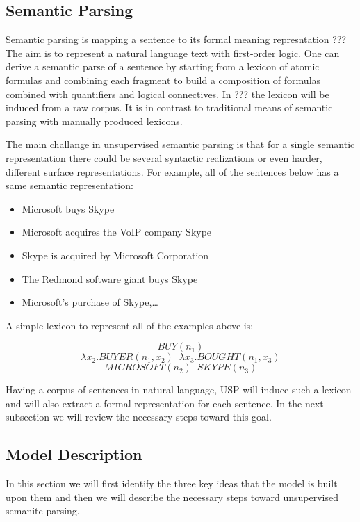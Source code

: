 \documentclass[12pt]{report}
\begin{document}
\subsection{Semantic Parsing}
\label{ch:definition}

Semantic parsing is mapping a sentence to its formal meaning represntation ???%
The aim is to represent a natural language text with first-order logic. One can derive a semantic parse of a sentence
by starting from a lexicon of atomic formulas and combining each fragment to build a composition of 
formulas combined with quantifiers and logical connectives. In ???%
 the lexicon will be induced from a raw corpus. It is in contrast to traditional means of semantic parsing with manually
  produced lexicons.
  
  The main challange in unsupervised semantic parsing is that for a single semantic representation there could be
  several syntactic realizations or even harder, different surface representations. For example, all of the
   sentences below has a same semantic representation:
   \begin{itemize}
     \item Microsoft buys Skype
     \item Microsoft acquires the VoIP company Skype
     \item Skype is acquired by Microsoft Corporation
     \item The Redmond software giant buys Skype
     \item Microsoft’s purchase of Skype,\ldots
   \end{itemize}  
  
   A simple lexicon to represent all of the examples above is:
  
   $$ BUY(n_1)$$
   $$ \lambda x_2.BUYER(n_1 , x_2) \; \;  \lambda x_3.BOUGHT(n_1 , x_3) $$
   $$ MICROSOFT(n_2) \; \; SKYPE(n_3)$$
   
   Having a corpus of sentences in natural language, USP %
    will induce such a lexicon and will also extract a formal representation for each sentence. In the next 
    subsection we will review the necessary steps toward this goal.
\subsection{Model Description}
\label{ch:model}
In this section we will first identify the three key ideas that the model is built upon them and then 
we will describe the necessary steps toward unsupervised semanitc parsing.
\end{document}

